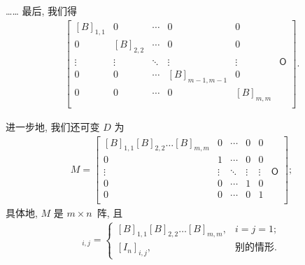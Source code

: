 \documentclass[../libro.tex]{subfiles}
\begin{document}
……
最后, 我们得
\begin{align*}
    \begin{bmatrix}
        [B]_{1,1} & 0         & \cdots & 0             & 0         & {}         \\
        0         & [B]_{2,2} & \cdots & 0             & 0         & {}         \\
        \vdots    & \vdots    & \ddots & \vdots        & \vdots    & \mathsf{O} \\
        0         & 0         & \cdots & [B]_{m-1,m-1} & 0         & {}         \\
        0         & 0         & \cdots & 0             & [B]_{m,m} & {}         \\
    \end{bmatrix}.
\end{align*}

进一步地, 我们还可变 \(D\) 为
\begin{align*}
    M =
    \begin{bmatrix}
        [B]_{1,1} [B]_{2,2} \dots [B]_{m,m} & 0      & \cdots & 0      & 0      & {}         \\
        0                                   & 1      & \cdots & 0      & 0      & {}         \\
        \vdots                              & \vdots & \ddots & \vdots & \vdots & \mathsf{O} \\
        0                                   & 0      & \cdots & 1      & 0      & {}         \\
        0                                   & 0      & \cdots & 0      & 1      & {}         \\
    \end{bmatrix};
\end{align*}
具体地, \(M\) 是 \(m \times n\)~阵,
且
\begin{align*}
    [M]_{i,j} =
    \begin{cases}
        [B]_{1,1} [B]_{2,2} \dots [B]_{m,m}, & i = j = 1;   \\
        [I_n]_{i,j},                         & \text{别的情形}.
    \end{cases}
\end{align*}
\end{document}
